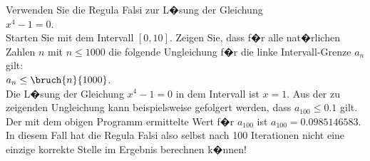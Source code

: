 \exercise
 Verwenden Sie die Regula Falsi zur L�sung der Gleichung 
\\[0.2cm]
\hspace*{1.3cm}
$x^4 - 1 = 0$.
\\[0.2cm]
Starten Sie mit dem Intervall $[0, 10]$. Zeigen Sie, dass f�r alle nat�rlichen Zahlen $n$
mit $n \leq 1000$ die folgende Ungleichung f�r die linke Intervall-Grenze $a_n$ gilt:
\\[0.2cm]
\hspace*{1.3cm} $a_n \leq \bruch{n}{1000}$.
\\[0.2cm]
Die L�sung der Gleichung $x^4 - 1 = 0$ in dem Intervall ist $x=1$.  Aus der zu zeigenden
Ungleichung kann beispielsweise gefolgert werden, dass $a_{100} \leq 0.1$ gilt.  
 Der mit dem obigen Programm ermittelte Wert f�r $a_{100}$ ist
$a_{100} = 0.0985146583$.  In diesem Fall hat die Regula Falsi also selbst nach  100
Iterationen nicht eine einzige korrekte Stelle 
im Ergebnis berechnen k�nnen!  \eox
\vspace*{0.3cm}

